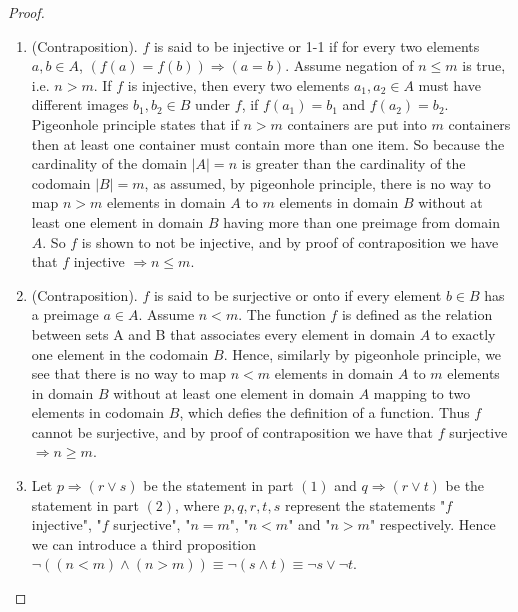 \documentclass[11pt,twoside, reqno, align]{amsart}
\theoremstyle{remark}
\newcommand{\OR}{\vee}
\newcommand{\AND}{\wedge}
\renewcommand{\implies}{\Rightarrow}
\begin{document}
\begin{proof}
\begin{enumerate}
    \item (Contraposition). $f$ is said to be injective or 1-1 if for every two elements $a,b \in A$, $(f(a) = f(b)) \implies (a = b)$. Assume negation of $n \leq m$ is true, i.e. $n > m$. If $f$ is injective, then every two elements $a_1,a_2 \in A$ must have different images $b_1,b_2 \in B$ under $f$, if $f(a_1) = b_1$ and $f(a_2) = b_2$. Pigeonhole principle states that if $n > m$ containers are put into $m$ containers then at least one container must contain more than one item. So because the cardinality of the domain $|A| = n$ is greater than the cardinality of the codomain $|B| = m$, as assumed, by pigeonhole principle, there is no way to map $n > m$ elements in domain $A$ to $m$ elements in domain $B$ without at least one element in domain $B$ having more than one preimage from domain $A$. So $f$ is shown to not be injective, and by proof of contraposition we have that $f$ injective $\implies n \leq m$.
    
    \item (Contraposition). $f$ is said to be surjective or onto if every element $b \in B$ has a preimage $a \in A$. Assume $n < m$. The function $f$ is defined as the relation between sets A and B that associates every element in domain $A$ to exactly one element in the codomain $B$. Hence, similarly by pigeonhole principle, we see that there is no way to map $n < m$ elements in domain $A$ to $m$ elements in domain $B$ without at least one element in domain $A$ mapping to two elements in codomain $B$, which defies the definition of a function. Thus $f$ cannot be surjective, and by proof of contraposition we have that $f$ surjective $\implies n \geq m$.
    
    \item Let $p \implies (r \OR s)$ be the statement in part $(1)$ and $q \implies (r \OR t)$ be the statement in part $(2)$, where $p, q, r, t, s$ represent the statements "$f$ injective", "$f$ surjective", "$n = m$", "$n < m$" and "$n > m$" respectively. Hence we can introduce a third proposition $\neg ((n < m)\AND(n > m)) \equiv \neg (s \AND t) \equiv \neg s \OR \neg t$.
    

\end{enumerate}
\end{proof}
\end{document}
